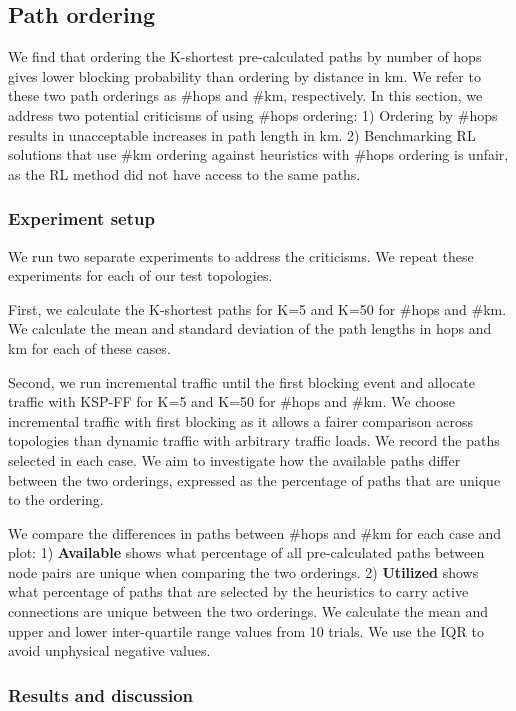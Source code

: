 \subsection{Path ordering}
\label{sec:path_ordering}

We find that ordering the K-shortest pre-calculated paths by number of hops gives lower blocking probability than ordering by distance in km. We refer to these two path orderings as \#hops and \#km, respectively. In this section, we address two potential criticisms of using \#hops ordering:
1) Ordering by \#hops results in unacceptable increases in path length in km.
2) Benchmarking RL solutions that use \#km ordering against heuristics with \#hops ordering is unfair, as the RL method did not have access to the same paths.

\subsubsection{Experiment setup}

We run two separate experiments to address the criticisms. We repeat these experiments for each of our test topologies.

First, we calculate the K-shortest paths for K=5 and K=50 for \#hops and \#km. We calculate the mean and standard deviation of the path lengths in hops and km for each of these cases.

Second, we run incremental traffic until the first blocking event and allocate traffic with KSP-FF for K=5 and K=50 for \#hops and \#km. We choose incremental traffic with first blocking as it allows a fairer comparison across topologies than dynamic traffic with arbitrary traffic loads. We record the paths selected in each case. We aim to investigate how the available paths differ between the two orderings, expressed as the percentage of paths that are unique to the ordering. 

We compare the differences in paths between \#hops and \#km for each case and plot: 1) \textbf{Available} shows what percentage of all pre-calculated paths between node pairs are unique when comparing the two orderings. 2) \textbf{Utilized} shows what percentage of paths that are selected by the heuristics to carry active connections are unique between the two orderings. We calculate the mean and upper and lower inter-quartile range values from 10 trials. We use the IQR to avoid unphysical negative values.

\subsubsection{Results and discussion}

